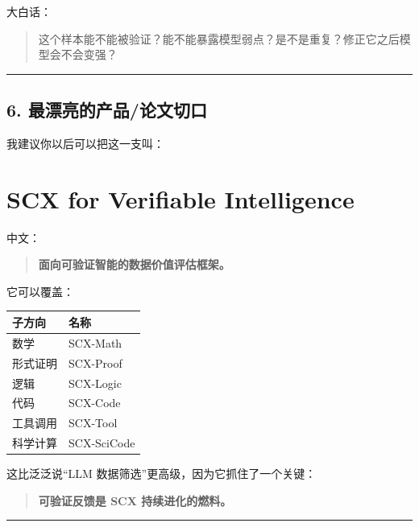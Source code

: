 \documentclass[
  12pt,
]{ctexart}
\begin{document}
大白话：

\begin{quote}
这个样本能不能被验证？能不能暴露模型弱点？是不是重复？修正它之后模型会不会变强？
\end{quote}

\begin{center}\rule{0.5\linewidth}{0.5pt}\end{center}

\subsection{6.
最漂亮的产品/论文切口}\label{ux6700ux6f02ux4eaeux7684ux4ea7ux54c1ux8bbaux6587ux5207ux53e3}

我建议你以后可以把这一支叫：

\section{\texorpdfstring{\textbf{SCX for Verifiable
Intelligence}}{SCX for Verifiable Intelligence}}\label{scx-for-verifiable-intelligence}

中文：

\begin{quote}
\textbf{面向可验证智能的数据价值评估框架。}
\end{quote}

它可以覆盖：

\begin{longtable}[]{@{}ll@{}}
\toprule\noalign{}
子方向 & 名称 \\
\midrule\noalign{}
\endhead
\bottomrule\noalign{}
\endlastfoot
数学 & SCX-Math \\
形式证明 & SCX-Proof \\
逻辑 & SCX-Logic \\
代码 & SCX-Code \\
工具调用 & SCX-Tool \\
科学计算 & SCX-SciCode \\
\end{longtable}

这比泛泛说``LLM 数据筛选''更高级，因为它抓住了一个关键：

\begin{quote}
\textbf{可验证反馈是 SCX 持续进化的燃料。}
\end{quote}

\begin{center}\rule{0.5\linewidth}{0.5pt}\end{center}
\end{document}
